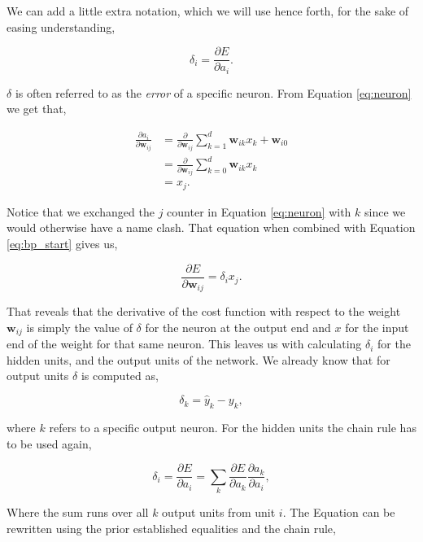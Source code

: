 We can add a little extra notation, which we will use hence forth, for the
sake of easing understanding,

\begin{equation}\label{eq:delta}
    \delta_i = \frac{\partial E}{\partial a_i}.
\end{equation}

$\delta$ is often referred to as the \textit{error} of a specific neuron.
From Equation \eqref{eq:neuron} we get that,

\begin{align}
    \frac{\partial a_i}{\partial \mathbf{w}_{ij}}
        &= \frac{\partial}{\partial \mathbf{w}_{ij}}
            \sum_{k=1}^d \mathbf{w}_{ik} x_k + \mathbf{w}_{i0}\\
        &= \frac{\partial}{\partial \mathbf{w}_{ij}} \sum_{k = 0}^d
            \mathbf{w}_{ik} x_k\\
        &= x_j.
\end{align}

Notice that we exchanged the $j$ counter in Equation \eqref{eq:neuron} with $k$
since we would otherwise have a name clash. That equation when combined with
Equation \ref{eq:bp_start} gives us,

\begin{equation} \label{eq:deriv}
    \frac{\partial E}{\partial \mathbf{w}_{ij}} = \delta_i x_j.
\end{equation}

That reveals that the derivative of the cost function with respect to the weight
$\mathbf{w}_{ij}$ is simply the value of $\delta$ for the neuron at the output
end and $x$ for the input end of the weight for that same neuron. This leaves us
with calculating $\delta_i$ for the hidden units, and the output units of the
network. We already know that for output units $\delta$ is computed as,

\begin{equation}
    \label{eq:output}
    \delta_k = \hat{y}_k - y_k,
\end{equation}

where $k$ refers to a specific output neuron. For the hidden units the chain
rule has to be used again,

\begin{equation}
    \label{eq:bp}
    \delta_i = \frac{\partial E}{\partial a_i} =
    \sum_k \frac{\partial E}{\partial a_k} \frac{\partial a_k}{\partial a_i},
\end{equation}

Where the sum runs over all $k$ output units from unit $i$. The Equation can be
rewritten using the prior established equalities and the chain rule,


